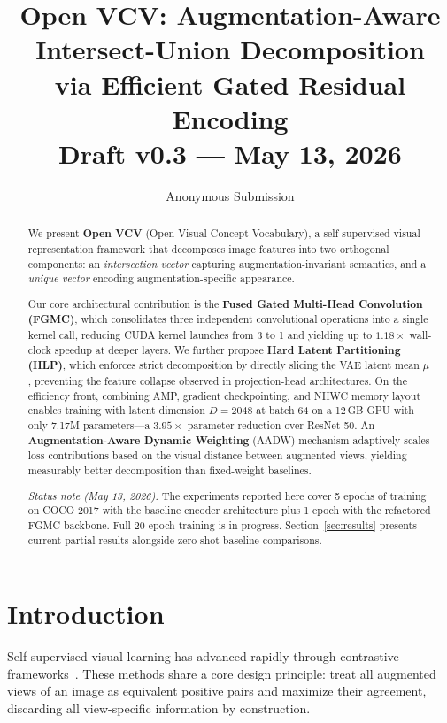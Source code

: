 \documentclass[10pt,twocolumn]{article}
\title{\textbf{Open VCV: Augmentation-Aware Intersect-Union Decomposition\\
via Efficient Gated Residual Encoding}\\[0.5em]
{\normalsize Draft v0.3 --- May 13, 2026}}
\author{Anonymous Submission}
\date{}
\begin{document}
\maketitle

\begin{abstract}
We present \textbf{Open VCV} (Open Visual Concept Vocabulary), a self-supervised
visual representation framework that decomposes image features into two orthogonal
components: an \emph{intersection vector} capturing augmentation-invariant semantics,
and a \emph{unique vector} encoding augmentation-specific appearance.

Our core architectural contribution is the \textbf{Fused Gated Multi-Head Convolution
(FGMC)}, which consolidates three independent convolutional operations into a single
kernel call, reducing CUDA kernel launches from 3 to 1 and yielding up to $1.18\times$
wall-clock speedup at deeper layers. We further propose \textbf{Hard Latent Partitioning
(HLP)}, which enforces strict decomposition by directly slicing the VAE latent mean
$\mu$, preventing the feature collapse observed in projection-head architectures. On
the efficiency front, combining AMP, gradient checkpointing, and NHWC memory layout
enables training with latent dimension $D{=}2048$ at batch 64 on a 12\,GB GPU with
only 7.17M parameters---a $3.95\times$ parameter reduction over ResNet-50. An
\textbf{Augmentation-Aware Dynamic Weighting} (AADW) mechanism adaptively scales
loss contributions based on the visual distance between augmented views, yielding
measurably better decomposition than fixed-weight baselines.

\emph{Status note (May 13, 2026).} The experiments reported here cover 5 epochs of
training on COCO 2017 with the baseline encoder architecture plus 1 epoch with the
refactored FGMC backbone. Full 20-epoch training is in progress. Section~\ref{sec:results}
presents current partial results alongside zero-shot baseline comparisons.
\end{abstract}

\section{Introduction}
\label{sec:intro}

Self-supervised visual learning has advanced rapidly through contrastive
frameworks~\cite{simclr,moco,byol}. These methods share a core design principle:
treat all augmented views of an image as equivalent positive pairs and maximize
their agreement, discarding all view-specific information by construction.
\end{document}
